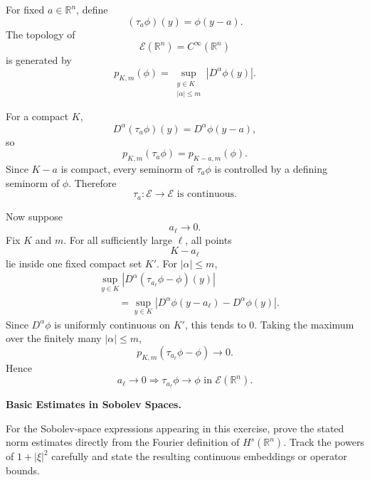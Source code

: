 \begin{solution}
For fixed \(a\in\mathbb R^n\), define
\[
(\tau_a\phi)(y)=\phi(y-a).
\]
The topology of
\[
\mathcal E(\mathbb R^n)=C^\infty(\mathbb R^n)
\]
is generated by
\[
p_{K,m}(\phi)
=
\sup_{\substack{y\in K\\|\alpha|\le m}}
|D^\alpha\phi(y)|.
\]

For a compact \(K\),
\[
D^\alpha(\tau_a\phi)(y)
=
D^\alpha\phi(y-a),
\]
so
\[
p_{K,m}(\tau_a\phi)
=
p_{K-a,m}(\phi).
\]
Since \(K-a\) is compact, every seminorm of \(\tau_a\phi\) is controlled by a defining
seminorm of \(\phi\). Therefore
\[
\boxed{\tau_a:\mathcal E\to\mathcal E\text{ is continuous}.}
\]

Now suppose
\[
a_\ell\to0.
\]
Fix \(K\) and \(m\). For all sufficiently large \(\ell\), all points
\[
K-a_\ell
\]
lie inside one fixed compact set \(K'\). For \(|\alpha|\le m\),
\[
\begin{aligned}
&\sup_{y\in K}
|D^\alpha(\tau_{a_\ell}\phi-\phi)(y)|\\
&\qquad=
\sup_{y\in K}
|D^\alpha\phi(y-a_\ell)-D^\alpha\phi(y)|.
\end{aligned}
\]
Since \(D^\alpha\phi\) is uniformly continuous on \(K'\), this tends to \(0\). Taking the
maximum over the finitely many \(|\alpha|\le m\),
\[
p_{K,m}(\tau_{a_\ell}\phi-\phi)\to0.
\]
Hence
\[
\boxed{
a_\ell\to0
\Longrightarrow
\tau_{a_\ell}\phi\to\phi
\text{ in }\mathcal E(\mathbb R^n).
}
\]
\end{solution}


\begin{problem}[CP-II-0068]
\label{prob:cp-ii-0068}
\textbf{Basic Estimates in Sobolev Spaces.}

\hspace*{1.5em}For the Sobolev-space expressions appearing in this exercise, prove the stated
norm estimates directly from the Fourier definition of \(H^s(\mathbb R^n)\).
Track the powers of \(1+|\xi|^2\) carefully and state the resulting continuous
embeddings or operator bounds.
\end{problem}

